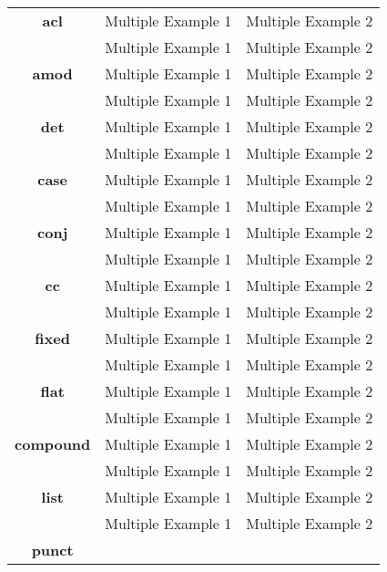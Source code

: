 \documentclass[a4 paper]{article}
\begin{document}
\begin{longtable}{cp{}p{}}
    \midrule
    \textbf{acl}
                 & Multiple Example 1 & Multiple Example 2\\
    \addlinespace[0.5em]
                 & Multiple Example 1 & Multiple Example 2\\
    \midrule
    \textbf{amod}
                 & Multiple Example 1 & Multiple Example 2\\
    \addlinespace[0.5em]
                 & Multiple Example 1 & Multiple Example 2\\
    \midrule
    \textbf{det}
                 & Multiple Example 1 & Multiple Example 2\\
    \addlinespace[0.5em]
                 & Multiple Example 1 & Multiple Example 2\\
    \midrule
    \textbf{case}
                 & Multiple Example 1 & Multiple Example 2\\
    \addlinespace[0.5em]
                 & Multiple Example 1 & Multiple Example 2\\
    \midrule
    \textbf{conj}
                 & Multiple Example 1 & Multiple Example 2\\
    \addlinespace[0.5em]
                 & Multiple Example 1 & Multiple Example 2\\
    \midrule
    \textbf{cc}
                 & Multiple Example 1 & Multiple Example 2\\
    \addlinespace[0.5em]
                 & Multiple Example 1 & Multiple Example 2\\
    \midrule
    \textbf{fixed}
                 & Multiple Example 1 & Multiple Example 2\\
    \addlinespace[0.5em]
                 & Multiple Example 1 & Multiple Example 2\\
    \midrule
    \textbf{flat}
                 & Multiple Example 1 & Multiple Example 2\\
    \addlinespace[0.5em]
                 & Multiple Example 1 & Multiple Example 2\\
    \midrule
    \textbf{compound}
                 & Multiple Example 1 & Multiple Example 2\\
    \addlinespace[0.5em]
                 & Multiple Example 1 & Multiple Example 2\\
    \midrule
    \textbf{list}
                 & Multiple Example 1 & Multiple Example 2\\
    \addlinespace[0.5em]
                 & Multiple Example 1 & Multiple Example 2\\
    \midrule
    \textbf{punct}

\end{longtable}
\end{document}
